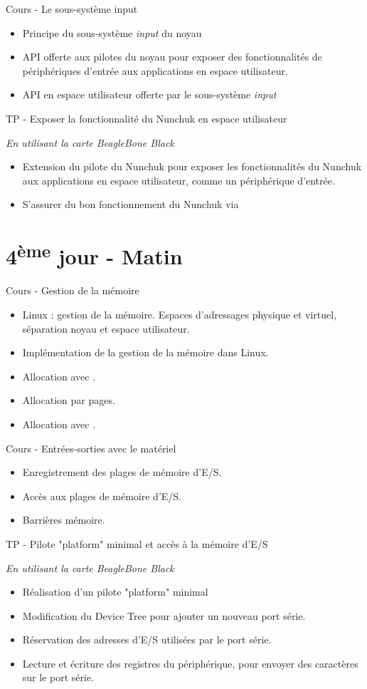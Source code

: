 \documentclass[a4paper,12pt,obeyspaces,spaces,hyphens]{article}
\begin{document}
\feagendatwocolumn
{Cours - Le sous-système input}
{
  \begin{itemize}
  \item Principe du sous-système {\em input} du noyau
  \item API offerte aux pilotes du noyau pour exposer
    des fonctionnalités de périphériques d'entrée aux
    applications en espace utilisateur.
  \item API en espace utilisateur offerte par le
    sous-système {\em input}
  \end{itemize}
}
{TP - Exposer la fonctionnalité du Nunchuk en espace utilisateur}
{
  {\em En utilisant la carte BeagleBone Black}
  \begin{itemize}
  \item Extension du pilote du Nunchuk pour exposer les fonctionnalités
    du Nunchuk aux applications en espace utilisateur, comme
    un périphérique d'entrée.
  \item S'assurer du bon fonctionnement du Nunchuk via 
  \end{itemize}
}

\section{4\textsuperscript{ème} jour - Matin}

\feagendatwocolumn
{Cours - Gestion de la mémoire}
{
  \begin{itemize}
  \item Linux : gestion de la mémoire. Espaces d'adressages physique et
     virtuel, séparation noyau et espace utilisateur.
  \item Implémentation de la gestion de la mémoire dans Linux.
  \item Allocation avec .
  \item Allocation par pages.
  \item Allocation avec .
  \end{itemize}
}
{Cours - Entrées-sorties avec le matériel}
{
  \begin{itemize}
  \item Enregistrement des plages de mémoire d'E/S.
  \item Accès aux plages de mémoire d'E/S.
  \item Barrières mémoire.
  \end{itemize}
}

\feagendaonecolumn
{TP - Pilote "platform" minimal et accès à la mémoire d'E/S}
{
  {\em En utilisant la carte BeagleBone Black}
  \begin{itemize}
  \item Réalisation d'un pilote "platform" minimal
  \item Modification du Device Tree pour ajouter un nouveau
    port série.
  \item Réservation des adresses d'E/S utilisées par le port série.
  \item Lecture et écriture des registres du périphérique, pour
    envoyer des caractères sur le port série.
  \end{itemize}
}
\end{document}
